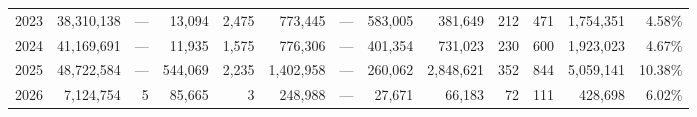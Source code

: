 \begin{table}
\begin{tabular}{rrrrrrrrrrrrr}
2023 & 38,310,138 & --- & 13,094 & 2,475 & 773,445 & --- & 583,005 & 381,649 & 212 & 471 & 1,754,351 & 4.58\% \\
2024 & 41,169,691 & --- & 11,935 & 1,575 & 776,306 & --- & 401,354 & 731,023 & 230 & 600 & 1,923,023 & 4.67\% \\
2025 & 48,722,584 & --- & 544,069 & 2,235 & 1,402,958 & --- & 260,062 & 2,848,621 & 352 & 844 & 5,059,141 & 10.38\% \\
2026 & 7,124,754 & 5 & 85,665 & 3 & 248,988 & --- & 27,671 & 66,183 & 72 & 111 & 428,698 & 6.02\% \\
\bottomrule
\end{tabular}
\end{table}
